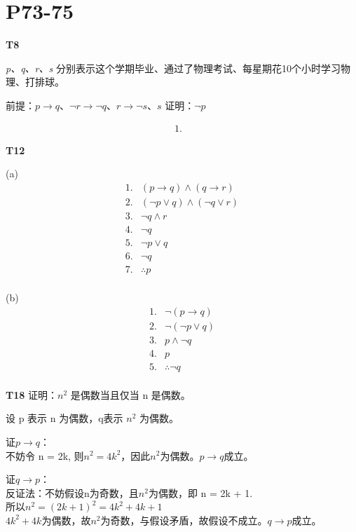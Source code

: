 \documentclass{article}
\begin{document}
\section{\textbf{P73-75}}

\textbf{T8}

\textit{p、q、r、s} 分别表示这个学期毕业、通过了物理考试、每星期花10个小时学习物理、打排球。

前提：$p \rightarrow q$、$\lnot r \rightarrow \lnot q$、$r \rightarrow \lnot s$、$s$
证明：$\lnot p$

\[
\begin{array}{cc}
    1. & 
\end{array}
\]

\vspace{10pt}

\textbf{T12}

(a)
\[
\begin{array}{cc}
    1. & (p \rightarrow q) \land (q \rightarrow r)\\
    2. & (\lnot p \lor q) \land (\lnot q \lor r)\\
    3. & \lnot q \land r\\
    4. & \lnot q\\
    5. & \lnot p \lor q\\
    6. & \lnot q\\
    \hline
    7. & \therefore p\\
\end{array}
\]

(b)
\[
\begin{array}{cc}
    1. & \lnot (p \rightarrow q)\\
    2. & \lnot (\lnot p \lor q)\\
    3. & p \land \lnot q\\
    4. & p\\
    \hline 
    5. & \therefore \lnot q\\
\end{array}
\]

\vspace{10pt}

\textbf{T18} 证明：$n^2$ 是偶数当且仅当 n 是偶数。

设 p 表示 n 为偶数，q表示 $n^2$ 为偶数。

证$p \rightarrow q$：\\
不妨令 n = 2k, 则$n^2 = 4k^2$，因此$n^2$为偶数。$p \rightarrow q$成立。

证$q \rightarrow p$：\\
反证法：不妨假设n为奇数，且$n^2$为偶数，即 n = 2k + 1.\\
所以$n^2 = (2k + 1)^2 = 4k^2 + 4k + 1$\\
$4k^2 + 4k$为偶数，故$n^2$为奇数，与假设矛盾，故假设不成立。$q \rightarrow p$成立。
\end{document}
